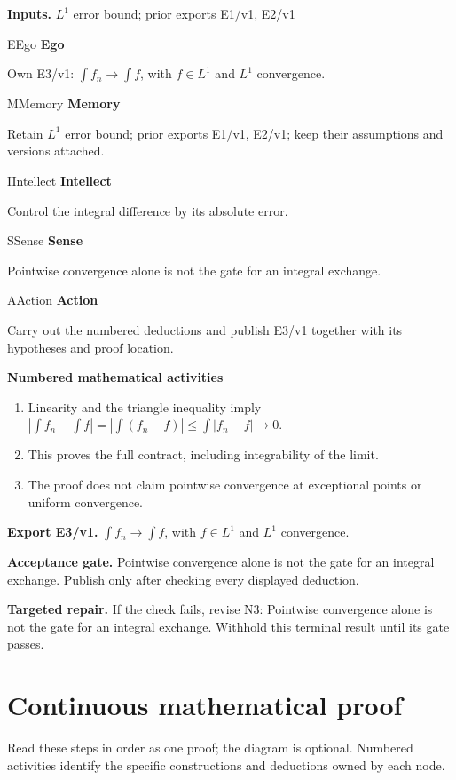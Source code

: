 \documentclass[preprint,12pt,aps,pra,showkeys,amsmath,amssymb,superscriptaddress,floatfix]{revtex4-2}
\theoremstyle{definition}
\theoremstyle{remark}
\newcommand{\mmfaculty}[3]{%
 \begin{mmfacultybox}{#1}{#2}
 {\sffamily\bfseries\color{MMBlue}#2}\par\smallskip #3
 \end{mmfacultybox}}
\newcommand{\field}[2]{\par\smallskip\noindent\textbf{#1.} #2\par}
\begin{document}
\field{Inputs}{\(L^{1}\) error bound; prior exports E1/v1, E2/v1}

\mmfaculty{E}{Ego}{Own E3/v1: \(\int f_n\to \int f\), with \(f\in L^{1}\) and \(L^{1}\)
convergence.}

\mmfaculty{M}{Memory}{Retain \(L^{1}\) error bound; prior exports E1/v1, E2/v1; keep their
assumptions and versions attached.}

\mmfaculty{I}{Intellect}{Control the integral difference by its absolute error.}

\mmfaculty{S}{Sense}{Pointwise convergence alone is not the gate for an integral exchange.}

\mmfaculty{A}{Action}{Carry out the numbered deductions and publish E3/v1 together with its
hypotheses and proof location.}

\smallskip\noindent\textbf{Numbered mathematical activities}

\begin{enumerate}[label=N3.\arabic*,leftmargin=3.4em]

\item Linearity and the triangle inequality imply
\(|\int f_n-\int f|=|\int (f_n-f)|\le \int |f_n-f|\to 0\).

\item This proves the full contract, including integrability of the limit.

\item The proof does not claim pointwise convergence at exceptional points or
uniform convergence.

\end{enumerate}

\field{Export E3/v1}{\(\int f_n\to \int f\), with \(f\in L^{1}\) and \(L^{1}\) convergence.}

\field{Acceptance gate}{Pointwise convergence alone is not the gate for an integral exchange.
Publish only after checking every displayed deduction.}

\field{Targeted repair}{If the check fails, revise N3: Pointwise convergence alone is not the
gate for an integral exchange. Withhold this terminal result until its
gate passes.}

\endgroup\clearpage\section{Continuous mathematical proof}\label{sec:proof}

Read these steps in order as one proof; the diagram is optional.
Numbered activities identify the specific constructions and deductions
owned by each node.
\end{document}
